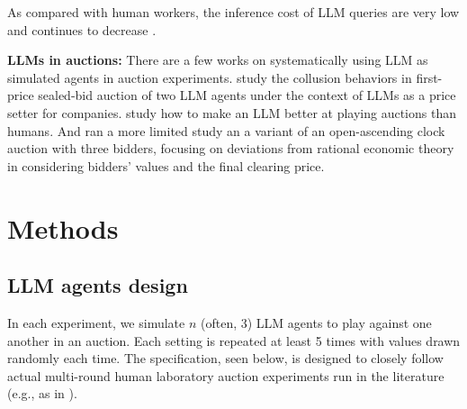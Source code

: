 \documentclass{article} %
\begin{document}
As compared with human workers, the inference cost of LLM queries are very low and continues to decrease \cite{achiam2023gpt,patel2023splitwise,bae2023complexitynet}.


\textbf{LLMs in auctions:}
There are a few works on systematically using LLM as simulated agents in auction experiments.
\citet{fish2024algorithmic} study the collusion behaviors in first-price sealed-bid auction of two LLM agents
 under the context of LLMs as a price setter for companies. 
\citet{chen2023put} study how to make an LLM better at playing auctions than humans.
And \citet{manning2024automated} ran a more limited study an  a variant of an open-ascending clock auction with three bidders, focusing on deviations from rational economic theory in considering bidders' values and the final clearing price.





\section{Methods}

\subsection{LLM agents design}


In each experiment, we simulate $n$ (often, 3) LLM agents to play against one another in an auction. 
Each setting is repeated at least 5 times with values drawn randomly each time. The specification, seen below, is designed to closely follow actual multi-round human laboratory auction experiments run in the literature (e.g., as in \cite{li2017obviously}). 
\end{document}
